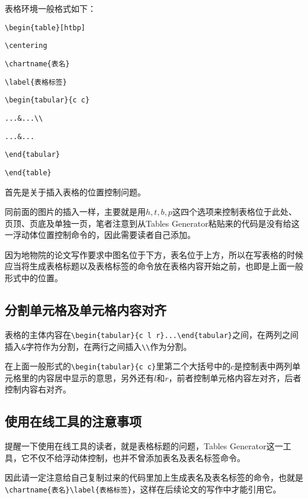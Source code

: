 表格环境一般格式如下：

\verb|\begin{table}[htbp]|\par 
\verb|\centering|\par 
\verb|\chartname{表名}|\par 
\verb|\label{表格标签}|\par 
\verb|\begin{tabular}{c c}|\par 
\verb|...&...\\|\par 
\verb|...&...|\par 
\verb|\end{tabular}|\par 
\verb|\end{table}|\par 

首先是关于插入表格的位置控制问题。

同前面的图片的插入一样，主要就是用$h,t,b,p$这四个选项来控制表格位于此处、页顶、页底及单独一页，笔者注意到从Tables Generator粘贴来的代码是没有给这一浮动体位置控制命令的，因此需要读者自己添加。

因为地物院的论文写作要求中图名位于下方，表名位于上方，所以在写表格的时候应当将生成表格标题以及表格标签的命令放在表格内容开始之前，也即是上面一般形式中的位置。

\subsection{分割单元格及单元格内容对齐}

表格的主体内容在\verb|\begin{tabular}{c l r}...\end{tabular}|之间，在两列之间插入\verb|&|字符作为分割，在两行之间插入\verb|\\|作为分割。
\par
在上面一般形式的\verb|\begin{tabular}{c c}|里第二个大括号中的$c$是控制表中两列单元格里的内容居中显示的意思，另外还有$l$和$r$，前者控制单元格内容左对齐，后者控制内容右对齐。

\subsection{使用在线工具的注意事项}

提醒一下使用在线工具的读者，就是表格标题的问题，Tables Generator这一工具，它不仅不给浮动体控制，也并不曾添加表名及表名标签命令。\par 因此请一定注意给自己复制过来的代码里加上生成表名及表名标签的命令，也就是\verb|\chartname{表名}\label{表格标签}|，这样在后续论文的写作中才能引用它。

